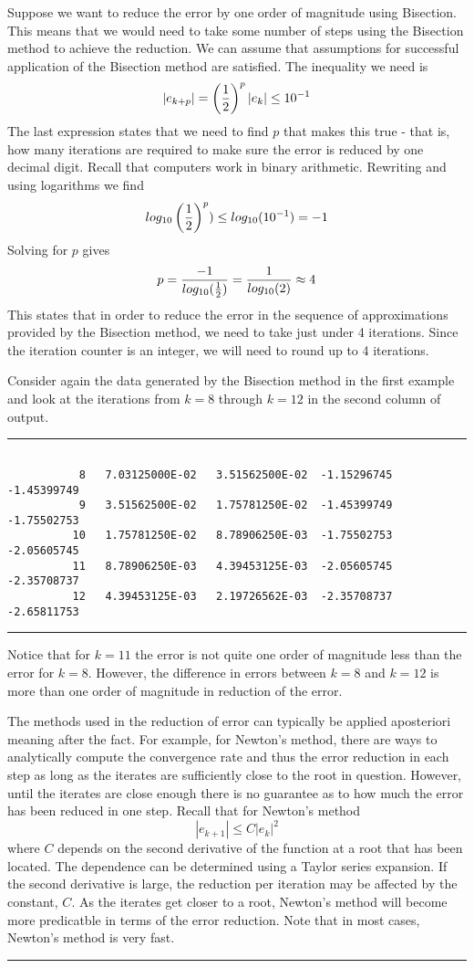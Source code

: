\documentclass[10pt,fleqn]{article}
\begin{document}
Suppose we want to reduce the error by one order of magnitude using Bisection.
This means that we would need to take some number of steps using the Bisection
method to achieve the reduction. We can assume that assumptions for successful
application of the Bisection method are satisfied. The inequality we need is
$$
  | e_{k+p} | = \left( {1\over 2} \right)^p | e_k | \leq 10^{-1}
$$
The last expression states that we need to find $p$ that makes this true - that
is, how many iterations are required to make sure the error is reduced by one
decimal digit. Recall that computers work in binary arithmetic. Rewriting and
using logarithms we find
$$
  log_{10}\left( {1\over 2} \right)^p ) \leq log_{10}(10^{-1}) = -1
$$
Solving for $p$ gives
$$
    p = {{-1}\over{log_{10}({1\over 2})}} = {1\over{log_{10}(2)}} \approx 4
$$
This states that in order to reduce the error in the sequence of approximations
provided by the Bisection method, we need to take just under 4 iterations. Since
the iteration counter is an integer, we will need to round up to 4 iterations.

Consider again the data generated by the Bisection method in the first example
and look at the iterations from $k=8$ through $k=12$ in the second column of
output.
\vskip0.1in\hrule\vskip0.1in
\begin{verbatim}

           8   7.03125000E-02   3.51562500E-02  -1.15296745      -1.45399749
           9   3.51562500E-02   1.75781250E-02  -1.45399749      -1.75502753
          10   1.75781250E-02   8.78906250E-03  -1.75502753      -2.05605745
          11   8.78906250E-03   4.39453125E-03  -2.05605745      -2.35708737
          12   4.39453125E-03   2.19726562E-03  -2.35708737      -2.65811753

\end{verbatim}
\vskip0.1in\hrule\vskip0.1in
\noindent
Notice that for $k=11$ the error is not quite one order of magnitude less than
the error for $k=8$. However, the difference in errors between $k=8$ and $k=12$
is more than one order of magnitude in reduction of the error.

The methods used in the reduction of error can typically be applied aposteriori
meaning after the fact. For example, for Newton's method, there are ways to
analytically compute the convergence rate and thus the error reduction in each
step as long as the iterates are sufficiently close to the root in question.
However, until the iterates are close enough there is no guarantee as to how
much the error has been reduced in one step. Recall that for Newton's method
$$
  | e_{k+1} | \leq C | e_k |^2
$$
where $C$ depends on the second derivative of the function at a root that has
been located. The dependence can be determined using a Taylor series expansion.
If the second derivative is large, the reduction per iteration may be affected
by the constant, $C$. As the iterates get closer to a root, Newton's method will
become more predicatble in terms of the error reduction. Note that in most
cases, Newton's method is very fast.
\vskip0.1in\hrule\vskip0.1in
\newpage
\end{document}
